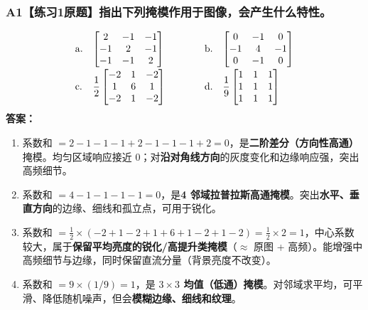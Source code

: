 \subsubsection*{A1【练习1原题】指出下列掩模作用于图像，会产生什么特性。}
\[
\begin{array}{@{}ll@{\qquad\qquad}ll@{}}
\mathrm{a.}&\begin{bmatrix}2&-1&-1\\-1&2&-1\\-1&-1&2\end{bmatrix}&
\mathrm{b.}&\begin{bmatrix}0&-1&0\\-1&4&-1\\0&-1&0\end{bmatrix}\\[1.4em]
\mathrm{c.}&\dfrac12\begin{bmatrix}-2&1&-2\\1&6&1\\-2&1&-2\end{bmatrix}&
\mathrm{d.}&\dfrac19\begin{bmatrix}1&1&1\\1&1&1\\1&1&1\end{bmatrix}
\end{array}
\]
\textbf{答案：}
\begin{enumerate}[label=\alph*.,leftmargin=*]
\item 系数和 $=2-1-1-1+2-1-1-1+2=0$，是\textbf{二阶差分（方向性高通）}掩模。均匀区域响应接近 0；对\textbf{沿对角线方向}的灰度变化和边缘响应强，突出高频细节。
\item 系数和 $=4-1-1-1-1=0$，是\textbf{4 邻域拉普拉斯高通掩模}。突出\textbf{水平、垂直方向}的边缘、细线和孤立点，可用于锐化。
\item 系数和 $=\frac12\times(-2+1-2+1+6+1-2+1-2)=\frac12\times2=1$，中心系数较大，属于\textbf{保留平均亮度的锐化/高提升类掩模}（$\approx$ 原图 + 高频）。能增强中高频细节与边缘，同时保留直流分量（背景亮度不改变）。
\item 系数和 $=9\times(1/9)=1$，是 \textbf{$3\times3$ 均值（低通）掩模}。对邻域求平均，可平滑、降低随机噪声，但会\textbf{模糊边缘、细线和纹理}。
\end{enumerate}

